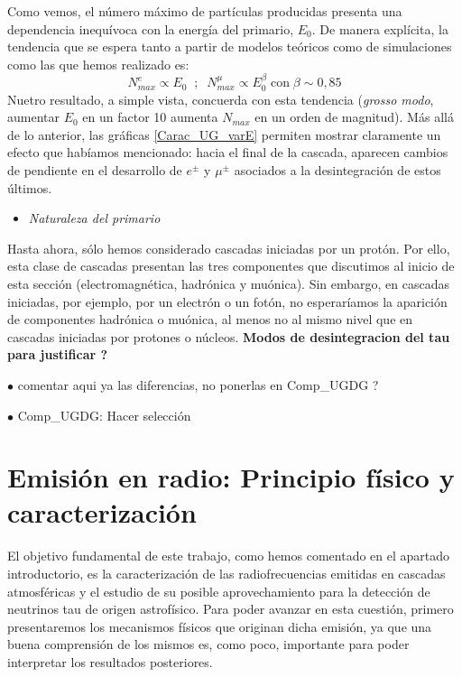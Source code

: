 \documentclass[12 pt, a4paper]{article} %
\numberwithin{equation}{section}
\numberwithin{figure}{section}
\numberwithin{table}{section}
\begin{document}
Como vemos, el número máximo de partículas producidas presenta una dependencia inequívoca con la energía del primario, $E_0$. De manera explícita, la tendencia que se espera tanto a partir de modelos teóricos como de simulaciones como las que hemos realizado es:
\begin{equation}
	N_{max}^{e}\propto E_0\;\;;\;\;N_{max}^{\mu}\propto E_0^\beta\;\text{con}\;\beta\sim0,85\label{ec25}
\end{equation}
Nuetro resultado, a simple vista, concuerda con esta tendencia (\textit{grosso modo}, aumentar $E_0$ en un factor 10 aumenta $N_{max}$ en un orden de magnitud). Más allá de lo anterior, las gráficas \ref{Carac_UG_varE} permiten mostrar claramente un efecto que habíamos mencionado: hacia el final de la cascada, aparecen cambios de pendiente en el desarrollo de $e^\pm$ y $\mu^\pm$ asociados a la desintegración de estos últimos.
\begin{itemize}
	\item \textit{Naturaleza del primario}
\end{itemize}
Hasta ahora, sólo hemos considerado cascadas iniciadas por un protón. Por ello, esta clase de cascadas presentan las tres componentes que discutimos al inicio de esta sección (electromagnética, hadrónica y muónica). Sin embargo, en cascadas iniciadas, por ejemplo, por un electrón o un fotón, no esperaríamos la aparición de componentes hadrónica o muónica, al menos no al mismo nivel que en cascadas iniciadas por protones o núcleos. \textbf{Modos de desintegracion del tau para justificar ?}

$\bullet$ comentar aqui ya las diferencias, no ponerlas en Comp\_UGDG ?

$\bullet$ Comp\_UGDG: Hacer selección
	\clearpage %
	\section{Emisión en radio: Principio físico y caracterización}\label{sec3}
	El objetivo fundamental de este trabajo, como hemos comentado en el apartado introductorio, es la caracterización de las radiofrecuencias emitidas en cascadas atmosféricas y el estudio de su posible aprovechamiento para la detección de neutrinos tau de origen astrofísico. Para poder avanzar en esta cuestión, primero presentaremos los mecanismos físicos que originan dicha emisión, ya que una buena comprensión de los mismos es, como poco, importante para poder interpretar los resultados posteriores.
\end{document}
